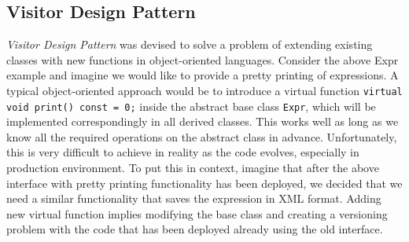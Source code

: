 \documentclass[preprint]{sigplanconf}
\DeclareRobustCommand{\code}[1]{{\lstinline[breaklines=false]{#1}}}
\begin{document}

\subsection{Visitor Design Pattern}
\label{sec:vdp}



\emph{Visitor Design Pattern}\cite{DesignPatterns1993} was devised to solve a problem 
of extending existing classes with new functions in object-oriented languages. 
Consider the above Expr example and imagine we would like to provide a pretty 
printing of expressions. A typical object-oriented approach would be to 
introduce a virtual function \code{virtual void print() const = 0;} inside the 
abstract base class \code{Expr}, which will be implemented correspondingly in all derived 
classes. This works well as long as we know all the required operations on the 
abstract class in advance. Unfortunately, this is very difficult to achieve in 
reality as the code evolves, especially in production environment. To put this 
in context, imagine that after the above interface with pretty printing 
functionality has been deployed, we decided that we need a similar functionality 
that saves the expression in XML format. Adding new virtual function implies 
modifying the base class and creating a versioning problem with the code that 
has been deployed already using the old interface.
\end{document}
